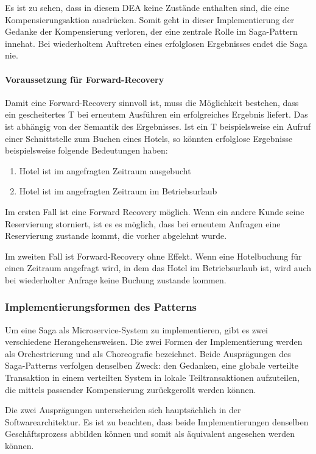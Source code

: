Es ist zu sehen, dass in diesem DEA keine Zustände enthalten sind, die eine Kompensierungsaktion ausdrücken. Somit geht in dieser Implementierung der Gedanke der Kompensierung verloren, der eine zentrale Rolle im Saga-Pattern innehat. Bei wiederholtem Auftreten eines erfolglosen Ergebnisses endet die Saga nie. 

\paragraph{Voraussetzung für Forward-Recovery}
Damit eine Forward-Recovery sinnvoll ist, muss die Möglichkeit bestehen, dass ein gescheitertes T bei erneutem Ausführen ein erfolgreiches Ergebnis liefert. Das ist abhängig von der Semantik des Ergebnisses. Ist ein T beispielsweise ein Aufruf einer Schnittstelle zum Buchen eines Hotels, so könnten erfolglose Ergebnisse beispielsweise folgende Bedeutungen haben:
\begin{enumerate}
	\item Hotel ist im angefragten Zeitraum ausgebucht
	\item Hotel ist im angefragten Zeitraum im Betriebsurlaub 
\end{enumerate}

Im ersten Fall ist eine Forward Recovery möglich. Wenn ein andere Kunde seine Reservierung storniert, ist es es möglich, dass bei erneutem Anfragen eine Reservierung zustande kommt, die vorher abgelehnt wurde.

Im zweiten Fall ist Forward-Recovery ohne Effekt. Wenn eine Hotelbuchung für einen Zeitraum angefragt wird, in dem das Hotel im Betriebsurlaub ist, wird auch bei wiederholter Anfrage keine Buchung zustande kommen.

\subsubsection{Implementierungsformen des Patterns}
Um eine Saga als Microservice-System zu implementieren, gibt es zwei verschiedene Herangehensweisen. Die zwei Formen der Implementierung werden als Orchestrierung und als Choreografie bezeichnet. Beide Ausprägungen des Saga-Patterns verfolgen denselben Zweck: den Gedanken, eine globale verteilte Transaktion in einem verteilten System in lokale Teiltransaktionen aufzuteilen, die mittels passender Kompensierung zurückgerollt werden können. 

Die zwei Ausprägungen unterscheiden sich hauptsächlich in der Softwarearchitektur. Es ist zu beachten, dass beide Implementierungen denselben Geschäftsprozess abbilden können und somit als äquivalent angesehen werden können. %

